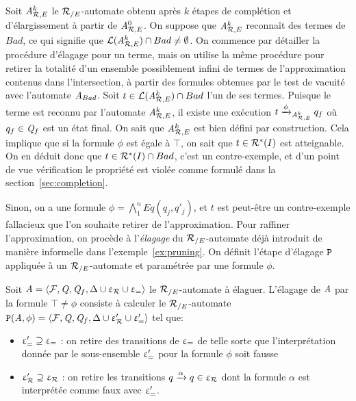 Soit ${\mathit A}_{\mathcal R,E}^k$ %
le ${\mathcal R_{/E}}$-automate obtenu après $k$ étapes de complétion et d'élargissement
à partir de ${\mathit A}_{\mathcal R,E}^0$. On suppose que ${\mathit A}_{\mathcal R,E}^k$ reconnaît des termes de $Bad$,
ce qui signifie que $\mathcal{L}({\mathit A}_{\mathcal R,E}^k) \cap Bad \not=\emptyset$. 
On commence par détailler la procédure d'élagage pour un terme, 
mais on utilise la même procédure pour retirer la totalité d'un ensemble possiblement
infini de termes de l'approximation contenus dans l'intersection, à partir des
formules obtenues par le test de vacuité avec l'automate $\mathit A_{Bad}$.
Soit $t \in \mathcal{L}({\mathit A}_{\mathcal R,E}^k) \cap Bad$ l'un de ses termes. 
Puisque le terme est reconnu par l'automate ${\mathit A}_{\mathcal R,E}^k$, il existe
une exécution $t \xrightarrow{\phi}_{{\mathit A}_{\mathcal R,E}^k} q_f$ où $q_f \in \mathit Q_f$ est un état final.
On sait que ${\mathit A}_{\mathcal R,E}^k$ est bien défini par construction.
Cela implique que si la formule $\phi$ est égale à $\top$, on sait que $t \in \mathcal R^*(I)$ est atteignable.
On en déduit donc que $t \in \mathcal R^*(I) \cap Bad$, c'est un contre-exemple, et d'un point de vue
vérification le propriété est violée comme formulé dans la section~\ref{sec:completion}.

Sinon, on a une formule $\phi = \bigwedge_1^n Eq(q_j, q'_j)$, et $t$ est peut-être un contre-exemple 
fallacieux que l'on souhaite retirer de l'approximation.
Pour raffiner l'approximation, on procède à l'\emph{élagage} du ${\mathcal R_{/E}}$-automate
déjà introduit de manière informelle dans l'exemple~\ref{ex:pruning}. On définit
l'étape d'élagage $\mathtt{P}$ appliquée à un ${\mathcal R_{/E}}$-automate et paramétrée par 
une formule $\phi$.


\begin{definition}
  \label{def:refinementstep}
  Soit $\mathit A = \langle \mathcal{F}, \mathit Q, \mathit Q_f, \Delta\cup \upvarepsilon_{\mathcal R} \cup \upvarepsilon_{=}\rangle$ le ${\mathcal R_{/E}}$-automate à élaguer.
  L'élagage de $\mathit A$ par la formule $\top\neq\phi$ consiste à calculer le ${\mathcal R_{/E}}$-automate $\mathtt{P}(\mathit A,\phi) = \langle \mathcal{F}, \mathit Q, \mathit Q_f, \Delta\cup \upvarepsilon_{\mathcal R}' \cup \upvarepsilon_{=}'\rangle$
  tel que:
  \begin{itemize}
  \item $\upvarepsilon_{=}'\supseteq\upvarepsilon_{=}$ : on retire des transitions de $\upvarepsilon_{=}$ de telle sorte que l'interprétation donnée par le sous-ensemble $\upvarepsilon_{=}'$ 
    pour la formule $\phi$ soit fausse
  \item $\upvarepsilon_{\mathcal R}'\supseteq\upvarepsilon_{\mathcal R}$ : on retire les transitions $q \xrightarrow{\alpha} q \in \upvarepsilon_{\mathcal R}$ dont la formule $\alpha$ est interprétée comme faux avec $\upvarepsilon_{=}'$.
  \end{itemize}
\end{definition}



